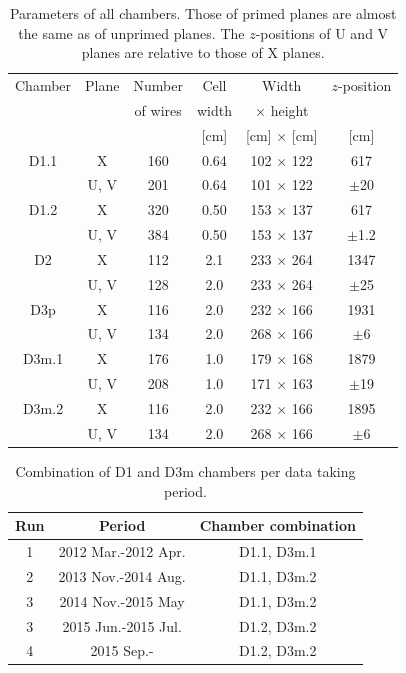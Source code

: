\begin{table}[bthp]\centering
  \begin{tabular}{cc|cccc}
    \hline \hline
    Chamber & Plane & Number   & Cell  & Width            & $z$-position \\
            &       & of wires & width & $\times$ height  &      \\ 
            &       &          & [cm]  & [cm] $\times$ [cm] & [cm] \\ 
    \hline
    D1.1    & X     & 160      & 0.64  & 102 $\times$ 122 &  617    \\
             & U, V  & 201      & 0.64  & 101 $\times$ 122 & $\pm$20 \\
    D1.2    & X     & 320      & 0.50  & 153 $\times$ 137 &  617    \\
             & U, V  & 384      & 0.50  & 153 $\times$ 137 & $\pm$1.2 \\
    D2      & X     & 112      & 2.1   & 233 $\times$ 264 & 1347    \\
             & U, V  & 128      & 2.0   & 233 $\times$ 264 & $\pm$25 \\
    D3p     & X     & 116      & 2.0   & 232 $\times$ 166 & 1931    \\
             & U, V  & 134      & 2.0   & 268 $\times$ 166 & $\pm$6  \\
    D3m.1   & X     & 176      & 1.0   & 179 $\times$ 168 & 1879    \\
             & U, V  & 208      & 1.0   & 171 $\times$ 163 & $\pm$19 \\
    D3m.2   & X     & 116      & 2.0   & 232 $\times$ 166 & 1895    \\
             & U, V  & 134      & 2.0   & 268 $\times$ 166 & $\pm$6  \\
    \hline
    \hline
  \end{tabular}
  \caption{Parameters of all chambers.
  	Those of primed planes are almost the same as of unprimed planes.
  	The $z$-positions of U and V planes are relative to those of X planes.
  }
  \label{table:cham:param}
\end{table}

\begin{table}[bthp]\centering
  \begin{tabular}{ccc}
    \hline
    Run & Period & Chamber combination \\
    \hline
    1 & 2012 Mar.-2012 Apr.  &  D1.1, D3m.1 \\
    2 & 2013 Nov.-2014 Aug.  &  D1.1, D3m.2 \\
    3 & 2014 Nov.-2015 May   &  D1.1, D3m.2 \\
    3 & 2015 Jun.-2015 Jul.  &  D1.2, D3m.2 \\
    4 & 2015 Sep.-   &  D1.2, D3m.2 \\
    \hline
  \end{tabular}
  \caption{Combination of D1 and D3m chambers per data taking period.}
  \label{tab:cham:comb1}
\end{table}

